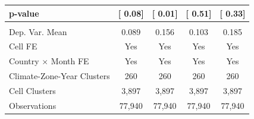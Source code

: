 {\begin{tabular}{l*{4}{c}}
\hspace{15pt} p-value&[     0.08]         &[     0.01]         &[     0.51]         &[     0.33]         \\
\hline \\ Dep. Var. Mean& 0.089         & 0.156         & 0.103         & 0.185         \\
Cell FE             &   Yes         &   Yes         &   Yes         &   Yes         \\
Country $\times$ Month FE&   Yes         &   Yes         &   Yes         &   Yes         \\
Climate-Zone-Year Clusters&   260         &   260         &   260         &   260         \\
Cell Clusters       & 3,897         & 3,897         & 3,897         & 3,897         \\
Observations        &77,940         &77,940         &77,940         &77,940         \\
\bottomrule
\end{tabular}
}
